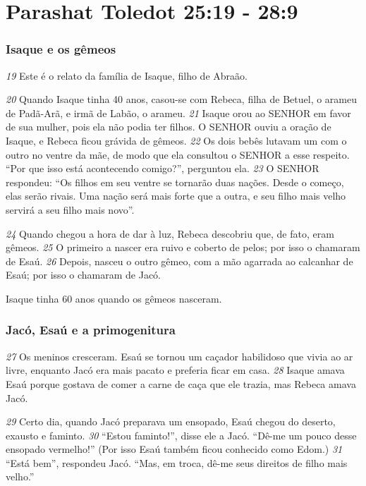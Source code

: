 \section*{Parashat Toledot 25:19 - 28:9}

\subsubsection*{Isaque e os gêmeos}

\textit{\tiny 19}
Este é o relato da família de Isaque, filho de Abraão. 

\bigskip
\textit{\tiny 20}
Quando Isaque tinha 40 anos, casou-se com Rebeca, filha de Betuel, o arameu de Padã-Arã, e irmã de
Labão, o arameu.
\textit{\tiny 21}
Isaque orou ao SENHOR em favor de sua mulher, pois ela não podia ter filhos.
O SENHOR ouviu a oração de Isaque, e Rebeca ficou grávida de gêmeos. 
\textit{\tiny 22}
Os dois
bebês lutavam um com o outro no ventre da mãe, de modo que ela consultou o
SENHOR a esse respeito. “Por que isso está acontecendo comigo?”, perguntou ela.
\textit{\tiny 23}
O SENHOR respondeu: “Os filhos em seu ventre se tornarão duas nações.
Desde o começo, elas serão rivais. Uma nação será mais forte que a outra, e seu
filho mais velho servirá a seu filho mais novo”.
   
\bigskip
\textit{\tiny 24}
Quando chegou a hora de dar à luz, Rebeca descobriu que, de fato, eram
gêmeos. 
\textit{\tiny 25}
O primeiro a nascer era ruivo e coberto de pelos; por isso o chamaram
de Esaú. 
\textit{\tiny 26}
Depois, nasceu o outro gêmeo, com a mão agarrada ao calcanhar de
Esaú; por isso o chamaram de Jacó. 

\bigskip
Isaque tinha 60 anos quando os gêmeos
nasceram.



\subsubsection*{Jacó, Esaú e a primogenitura}

\textit{\tiny 27}
Os meninos cresceram. Esaú se tornou um caçador habilidoso que vivia ao ar
livre, enquanto Jacó era mais pacato e preferia ficar em casa. 
\textit{\tiny 28}
Isaque amava Esaú
porque gostava de comer a carne de caça que ele trazia, mas Rebeca amava Jacó.

\bigskip   
\textit{\tiny 29}
Certo dia, quando Jacó preparava um ensopado, Esaú chegou do deserto,
exausto e faminto. 
\textit{\tiny 30}
“Estou faminto!”, disse ele a Jacó. “Dê-me um pouco desse
ensopado vermelho!” (Por isso Esaú também ficou conhecido como Edom.)
\textit{\tiny 31}
“Está bem”, respondeu Jacó. “Mas, em troca, dê-me seus direitos de filho mais
velho.”
   
